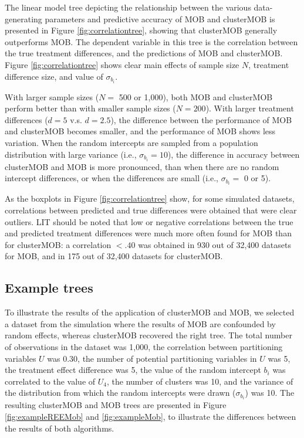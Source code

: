 \documentclass[nobf,man]{apa}
\begin{document}
The linear model tree depicting the relationship between the various data-generating parameters and predictive accuracy of MOB and clusterMOB is presented in Figure \ref{fig:correlationtree}, showing that clusterMOB generally outperforms MOB. The dependent variable in this tree is the correlation between the true treatment differences, and the predictions of MOB and clusterMOB. Figure \ref{fig:correlationtree} shows clear main effects of sample size $N$, treatment difference size, and value of $\sigma_{b_i}$.

With larger sample sizes ($N =$ 500 or 1,000), both MOB and clusterMOB perform better than with smaller sample sizes ($N = 200$). With larger treatment differences ($d=5$ v.s. $d=2.5$), the difference between the performance of MOB and clusterMOB becomes smaller, and the performance of MOB shows less variation. When the random intercepts are sampled from a population distribution with large variance (i.e., $\sigma_{b_i} = 10$), the difference in accuracy between clusterMOB and MOB is more pronounced, than when there are no random intercept differences, or when the differences are small (i.e., $\sigma_{b_i} = $ 0 or 5).

As the boxplots in Figure \ref{fig:correlationtree} show, for some simulated datasets, correlations between predicted and true differences were obtained that were clear outliers. LIT should be noted that low or negative correlations between the true and predicted treatment differences were much more often found for MOB than for clusterMOB: a correlation $<.40$ was obtained in 930 out of 32,400 datasets for MOB, and in 175 out of 32,400 datasets for clusterMOB. 


\subsection{Example trees}

To illustrate the results of the application of clusterMOB and MOB, we selected a dataset from the simulation where the results of MOB are confounded by random effects, whereas clusterMOB recovered the right tree. The total number of observations in the dataset was 1,000, the correlation between partitioning variables $U$ was 0.30, the number of potential partitioning variables in $U$ was 5, the treatment effect difference was 5, the value of the random intercept $b_i$ was correlated to the value of $U_4$, the number of clusters was 10, and the variance of the distribution from which the random intercepts were drawn ($\sigma_{b_{i}}$) was 10. The resulting clusterMOB and MOB trees are presented in Figure \ref{fig:exampleREEMob} and \ref{fig:exampleMob}, to illustrate the differences between the results of both algorithms. 
\end{document}
